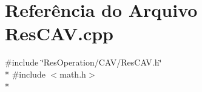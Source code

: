 \section{Referência do Arquivo Res\+C\+A\+V.\+cpp}
\label{_c_a_v_2_res_c_a_v_8cpp}
{\ttfamily \#include \char`\"{}Res\+Operation/\+C\+A\+V/\+Res\+C\+A\+V.\+h\char`\"{}}\\*
{\ttfamily \#include $<$math.\+h$>$}\\*
